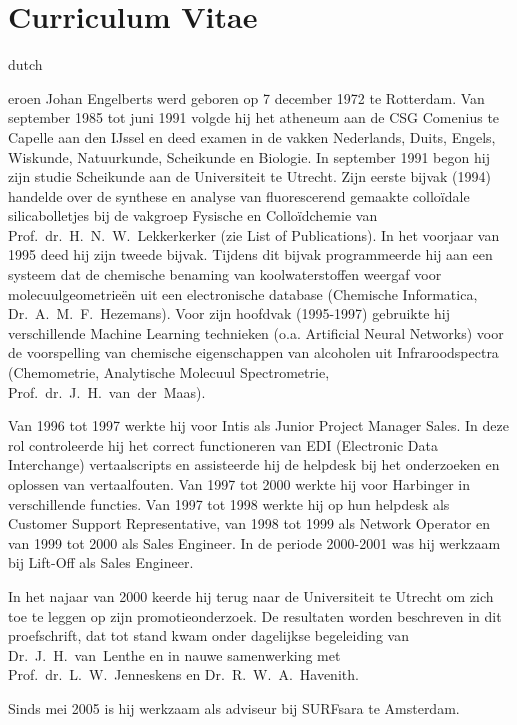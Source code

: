 \chapter*{Curriculum Vitae}
\fancyhead[RO]{\thepage}
\fancyhead[LE]{\thepage}
\begin{otherlanguage*}{dutch}
\label{cv}

\lettrine{}{}eroen Johan Engelberts werd geboren op 7 december 1972 te Rotterdam. Van september 1985 tot juni 1991 volgde hij het atheneum aan de CSG Comenius te Capelle aan den IJssel en deed examen in de vakken Nederlands, Duits, Engels, Wiskunde, Natuurkunde, Scheikunde en Biologie. In september 1991 begon hij zijn studie Scheikunde aan de Universiteit te Utrecht. Zijn eerste bijvak (1994) handelde over de synthese en analyse van fluorescerend gemaakte collo\"idale silicabolletjes bij de vakgroep Fysische en Collo\"idchemie van Prof.~dr.~H.~N.~W.~Lekkerkerker (zie List of Publications). In het voorjaar van 1995 deed hij zijn tweede bijvak. Tijdens dit bijvak programmeerde hij aan een systeem dat de chemische benaming van koolwaterstoffen weergaf voor molecuulgeometrie\"en uit een electronische database (Chemische Informatica, Dr.~A.~M.~F.~Hezemans). Voor zijn hoofdvak (1995-1997) gebruikte hij verschillende Machine Learning technieken (o.a. Artificial Neural Networks) voor de voorspelling van chemische eigenschappen van alcoholen uit Infraroodspectra (Chemometrie, Analytische Molecuul Spectrometrie, Prof.~dr.~J.~H.~van~der~Maas).

Van 1996 tot 1997 werkte hij voor Intis als Junior Project Manager Sales. In deze rol controleerde hij het correct functioneren van EDI (Electronic Data Interchange) vertaalscripts en assisteerde hij de helpdesk bij het onderzoeken en oplossen van vertaalfouten.  Van 1997 tot 2000 werkte hij voor Harbinger in verschillende functies. Van 1997 tot 1998 werkte hij op hun helpdesk als Customer Support Representative, van 1998 tot 1999 als Network Operator en van 1999 tot 2000 als Sales Engineer. In de periode 2000-2001 was hij werkzaam bij Lift-Off als Sales Engineer.

In het najaar van 2000 keerde hij terug naar de Universiteit te Utrecht om zich toe te leggen op zijn promotieonderzoek. De resultaten worden beschreven in dit proefschrift, dat tot stand kwam onder dagelijkse begeleiding van Dr.~J.~H.~van~Lenthe en in nauwe samenwerking met Prof.~dr.~L.~W.~Jenneskens en Dr.~R.~W.~A.~Havenith.

Sinds mei 2005 is hij werkzaam als adviseur bij SURFsara te Amsterdam.
\end{otherlanguage*}
